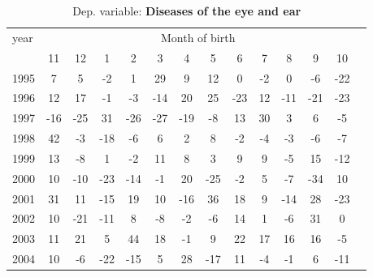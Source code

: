  \begin{table}[H] \begin{threeparttable} \centering \caption{Dep. variable: \textbf{Diseases of the eye and ear}} {\def\sym#1{\ifmmode^{#1}\else\(^{#1}\)\fi} \begin{tabular}{l*{13}{c}} \toprule year & \multicolumn{12}{c}{Month of birth} \\ \cmidrule(lr){2-13} 
            &          11&          12&           1&           2&           3&           4&           5&           6&           7&           8&           9&          10\\
1995        &           7&           5&          -2&           1&          29&           9&          12&           0&          -2&           0&          -6&         -22\\
1996        &          12&          17&          -1&          -3&         -14&          20&          25&         -23&          12&         -11&         -21&         -23\\
1997        &         -16&         -25&          31&         -26&         -27&         -19&          -8&          13&          30&           3&           6&          -5\\
1998        &          42&          -3&         -18&          -6&           6&           2&           8&          -2&          -4&          -3&          -6&          -7\\
1999        &          13&          -8&           1&          -2&          11&           8&           3&           9&           9&          -5&          15&         -12\\
2000        &          10&         -10&         -23&         -14&          -1&          20&         -25&          -2&           5&          -7&         -34&          10\\
2001        &          31&          11&         -15&          19&          10&         -16&          36&          18&           9&         -14&          28&         -23\\
2002        &          10&         -21&         -11&           8&          -8&          -2&          -6&          14&           1&          -6&          31&           0\\
2003        &          11&          21&           5&          44&          18&          -1&           9&          22&          17&          16&          16&          -5\\
2004        &          10&          -6&         -22&         -15&           5&          28&         -17&          11&          -4&          -1&           6&         -11\\

\end{tabular}}
\end{threeparttable}
\end{table}
